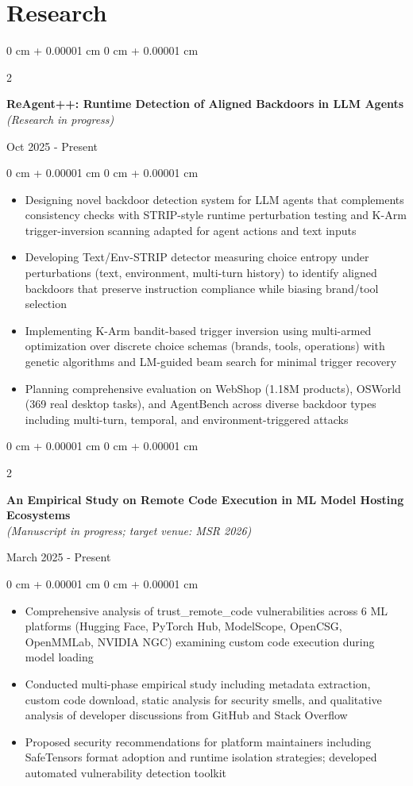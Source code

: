 \documentclass[10pt, letterpaper]{article}
\newenvironment{highlights}{
    \begin{itemize}[
        topsep=0.10 cm,
        parsep=0.10 cm,
        partopsep=0pt,
        itemsep=0pt,
        leftmargin=0 cm + 10pt
    ]
}{
    \end{itemize}
} %
\newenvironment{onecolentry}{
    \begin{adjustwidth}{
        0 cm + 0.00001 cm
    }{
        0 cm + 0.00001 cm
    }
}{
    \end{adjustwidth}
} %
\newenvironment{twocolentry}[2][]{
    \onecolentry
    \def\secondColumn{#2}
    \setcolumnwidth{\fill, 4.5 cm}
    \begin{paracol}{2}
}{
    \switchcolumn \raggedleft \secondColumn
    \end{paracol}
    \endonecolentry
} %
\begin{document}
        
    \section{Research}

    \begin{twocolentry}{Oct 2025 - Present}
    \textbf{ReAgent++: Runtime Detection of Aligned Backdoors in LLM Agents} \\
    \textit{(Research in progress)}
\end{twocolentry}

\begin{onecolentry}
    \begin{highlights}
        \item Designing novel backdoor detection system for LLM agents that complements consistency checks with STRIP-style runtime perturbation testing and K-Arm trigger-inversion scanning adapted for agent actions and text inputs
        \item Developing Text/Env-STRIP detector measuring choice entropy under perturbations (text, environment, multi-turn history) to identify aligned backdoors that preserve instruction compliance while biasing brand/tool selection
        \item Implementing K-Arm bandit-based trigger inversion using multi-armed optimization over discrete choice schemas (brands, tools, operations) with genetic algorithms and LM-guided beam search for minimal trigger recovery
        \item Planning comprehensive evaluation on WebShop (1.18M products), OSWorld (369 real desktop tasks), and AgentBench across diverse backdoor types including multi-turn, temporal, and environment-triggered attacks
    \end{highlights}
\end{onecolentry}

    \begin{twocolentry}{March 2025 - Present}
    \textbf{An Empirical Study on Remote Code Execution in ML Model Hosting Ecosystems} \\
    \textit{(Manuscript in progress; target venue: MSR 2026)}
\end{twocolentry}

\begin{onecolentry}
    \begin{highlights}
        \item Comprehensive analysis of trust\_remote\_code vulnerabilities across 6 ML platforms (Hugging Face, PyTorch Hub, ModelScope, OpenCSG, OpenMMLab, NVIDIA NGC) examining custom code execution during model loading
        \item Conducted multi-phase empirical study including metadata extraction, custom code download, static analysis for security smells, and qualitative analysis of developer discussions from GitHub and Stack Overflow
        \item Proposed security recommendations for platform maintainers including SafeTensors format adoption and runtime isolation strategies; developed automated vulnerability detection toolkit
    \end{highlights}
\end{onecolentry}
\end{document}
